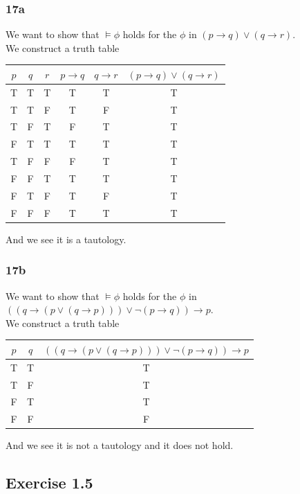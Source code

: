 \documentclass[12pt]{article}
\let\imp\to
\begin{document}
\subsubsection*{17a}
We want to show that $\models\phi$ holds for the $\phi$ in $(p\imp q)\lor (q\imp r)$. \\
We construct a truth table\\
\begin{center}
\begin{tabular}{|c|c|c||c|c||c|}
\hline 
$p$ & $q$ & $r$ & $p\to q$ & $q\to r$ & $(p\imp q)\lor (q\imp r)$ \\ 
\hline 
T & T & T & T & T & T \\ 
\hline 
T & T & F & T & F & T \\ 
\hline 
T & F & T & F & T & T \\ 
\hline
F & T & T & T & T & T \\ 
\hline  
T & F & F & F & T & T \\ 
\hline 
F & F & T & T & T & T \\ 
\hline 
F & T & F & T & F & T \\ 
\hline 
F & F & F & T & T & T\\ 
\hline 
\end{tabular} 
\end{center}
And we see it is a tautology.

\subsubsection*{17b}
We want to show that $\models\phi$ holds for the $\phi$ in $((q\to (p\lor(q\to p)))\lor \neg(p\to q))\to p$. \\
We construct a truth table\\
\begin{center}
\begin{tabular}{|c|c||c|}
\hline 
$p$ & $q$ & $((q\to (p\lor(q\to p)))\lor \neg(p\to q))\to p$ \\ 
\hline 
T & T & T \\ 
\hline 
T & F & T \\ 
\hline 
F & T & T \\ 
\hline
F & F & F \\ 
\hline
\end{tabular} 
\end{center}
And we see it is not a tautology and it does not hold.

\subsection*{Exercise 1.5}
\end{document}
